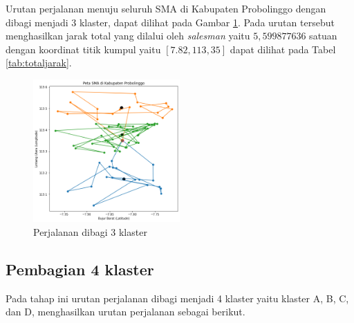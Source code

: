 Urutan perjalanan menuju seluruh SMA di Kabupaten Probolinggo dengan dibagi menjadi 3 klaster, dapat dilihat pada Gambar \ref{fig:hasil_mtsp3}. Pada urutan tersebut menghasilkan jarak total yang dilalui oleh \textit{salesman} yaitu $5,599877636$ satuan dengan koordinat titik kumpul yaitu $[7.82, 113,35]$ dapat dilihat pada Tabel \ref{tab:totaljarak}.

\begin{figure}[H]
\centering
\includegraphics[width=0.5\textwidth]{Gambar/hasil_mtsp/3}
\caption{Perjalanan dibagi 3 klaster}
\label{fig:hasil_mtsp3}
\end{figure}

\subsection{Pembagian 4 klaster}

Pada tahap ini urutan perjalanan dibagi menjadi 4 klaster yaitu klaster A, B, C, dan D, menghasilkan urutan perjalanan sebagai berikut.

